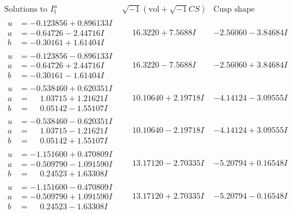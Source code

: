 \documentclass[1p]{elsarticle_modified}
\theoremstyle{definition}
\newcommand{\I}{\sqrt{-1}}
\begin{document}
$$\begin{array}{c|c|c}  
\text{Solutions to }I^u_{1}& \I (\text{vol} + \sqrt{-1}CS) & \text{Cusp shape}\\
 \hline 
\begin{aligned}
u &= -0.123856 + 0.896133 I \\
a &= -0.64726 - 2.44716 I \\
b &= -0.30161 + 1.61404 I\end{aligned}
 & \phantom{-}16.3220 + 7.5688 I & -2.56060 - 3.84684 I \\ \hline\begin{aligned}
u &= -0.123856 - 0.896133 I \\
a &= -0.64726 + 2.44716 I \\
b &= -0.30161 - 1.61404 I\end{aligned}
 & \phantom{-}16.3220 - 7.5688 I & -2.56060 + 3.84684 I \\ \hline\begin{aligned}
u &= -0.538460 + 0.620351 I \\
a &= \phantom{-}1.03715 + 1.21621 I \\
b &= \phantom{-}0.05142 - 1.55107 I\end{aligned}
 & \phantom{-}10.10640 + 2.19718 I & -4.14124 - 3.09555 I \\ \hline\begin{aligned}
u &= -0.538460 - 0.620351 I \\
a &= \phantom{-}1.03715 - 1.21621 I \\
b &= \phantom{-}0.05142 + 1.55107 I\end{aligned}
 & \phantom{-}10.10640 - 2.19718 I & -4.14124 + 3.09555 I \\ \hline\begin{aligned}
u &= -1.151600 + 0.470809 I \\
a &= -0.509790 - 1.091590 I \\
b &= \phantom{-}0.24523 + 1.63308 I\end{aligned}
 & \phantom{-}13.17120 - 2.70335 I & -5.20794 + 0.16548 I \\ \hline\begin{aligned}
u &= -1.151600 - 0.470809 I \\
a &= -0.509790 + 1.091590 I \\
b &= \phantom{-}0.24523 - 1.63308 I\end{aligned}
 & \phantom{-}13.17120 + 2.70335 I & -5.20794 - 0.16548 I \\ \hline\begin{aligned}

\end{aligned}
\end{array}$$
\end{document}
